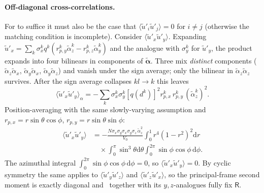 \documentclass[
 amsmath,amssymb,
 aps,
 twocolumn,
]{revtex4-2}
\renewcommand{\vec}[1]{\boldsymbol{#1}}
\newcommand{\dd}{\mathrm{d}}
\newcommand{\bR}{\mathsf{R}}
\begin{document}
\paragraph*{Off-diagonal cross-correlations.}
For  to suffice it must also be the case that
$\langle\tilde u'_i\tilde u'_j\rangle=0$ for $i\ne j$ (otherwise the
matching condition is incomplete). Consider $\langle\tilde u'_x\tilde
u'_y\rangle$. Expanding
$\tilde u'_x=\sum_k\sigma_x^k q^k(r_{p,y}^k\tilde\alpha_z^k-r_{p,z}^k\tilde\alpha_y^k)$
and the analogue with $\sigma_y^k$ for $\tilde u'_y$, the
product expands into four bilinears in components of $\vec{\tilde\alpha}$.
Three mix \emph{distinct} components
($\tilde\alpha_z\tilde\alpha_x$, $\tilde\alpha_y\tilde\alpha_x$,
$\tilde\alpha_y\tilde\alpha_z$) and vanish under the sign average; only
the bilinear in $\tilde\alpha_z\tilde\alpha_z$ survives. After the sign
average collapses $kl\to k$ this leaves
\begin{equation}\label{eq:app_offdiag_survive}
  \langle\tilde u'_x\tilde u'_y\rangle_\alpha
  = -\sum_k\sigma_x^k\sigma_y^k[q(d^k)]^2
       r_{p,x}^k\,r_{p,y}^k\,(\tilde\alpha_z^k)^2.
\end{equation}
Position-averaging with the same slowly-varying assumption and
$r_{p,x}=r\sin\theta\cos\phi$, $r_{p,y}=r\sin\theta\sin\phi$:
\begin{equation}\label{eq:app_offdiag}
\begin{aligned}
  \langle\tilde u'_x\tilde u'_y\rangle
  &= -\frac{N\sigma_x\sigma_y\sigma_x\sigma_y\sigma_z\,\tilde\alpha_z^2}{V_0}
     \!\int_0^1\!r^4(1-r^2)^2\dd r\\
  &\quad\times\!\int_0^\pi\!\sin^3\theta\dd\theta\!\int_0^{2\pi}\!\sin\phi\cos\phi\,\dd\phi.
\end{aligned}
\end{equation}
The azimuthal integral $\int_0^{2\pi}\sin\phi\cos\phi\,\dd\phi=0$, so
$\langle\tilde u'_x\tilde u'_y\rangle=0$. By cyclic symmetry the same
applies to $\langle\tilde u'_y\tilde u'_z\rangle$ and
$\langle\tilde u'_z\tilde u'_x\rangle$, so the principal-frame second
moment is exactly diagonal and~ together with its
$y,z$-analogues fully fix $\bR$.
\end{document}
